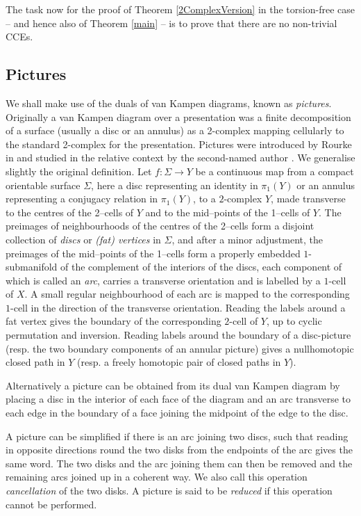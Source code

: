 \documentclass[12pt,a4paper]{amsart}
\begin{document}
\smallskip
The task now  for the proof of Theorem \ref{2ComplexVersion} in the torsion-free case 
-- and hence also of Theorem \ref{main} -- is to prove that there are no
non-trivial CCEs.  



\subsection{Pictures} 

We shall  make use of the duals of van Kampen diagrams, 
known as {\em pictures}.   
Originally a van Kampen diagram over a presentation was 
a finite decomposition of a surface (usually a disc or an annulus)
as a 2-complex mapping cellularly to the standard 2-complex for the presentation.
Pictures were introduced by Rourke in \cite{Rou} and studied in  the relative context by the second-named author \cite{S81}. 
We generalise slightly the original definition.
Let  $f:\Sigma\to Y$ be a continuous map from  a compact orientable surface  $\Sigma$,  
	here a disc representing an identity in $\pi_1(Y)$ 
	or an annulus representing a conjugacy relation in $\pi_1(Y)$, to  a $2$-complex $Y$, made transverse to the centres of the 2--cells of $Y$ and
	to the mid--points of the 1--cells of $Y$.
	The preimages of neighbourhoods of the centres of the 2--cells form a disjoint collection of 
	{\em discs} or {\em (fat) vertices} in $\Sigma$, and after a minor adjustment, 
	the preimages of the mid--points of the 1--cells form a properly embedded $1$-submanifold of the complement of the interiors of the discs, 
	each component of which is called an {\em arc}, carries a transverse orientation and is labelled by a $1$-cell of $X$.
A small regular neighbourhood of each arc is mapped to the corresponding $1$-cell in the direction of the transverse orientation.  
Reading the labels around a fat vertex gives the boundary of the corresponding $2$-cell of $Y$, up to cyclic permutation and inversion.    Reading labels around the boundary of a disc-picture (resp. the two boundary components of an annular picture) gives a nullhomotopic closed path in $Y$ (resp. a freely homotopic pair of closed paths in $Y$). 

Alternatively a picture can be obtained from 
 its dual van Kampen diagram by placing a disc in the interior of each face of the diagram and an arc transverse to each edge in the boundary of a face joining the midpoint of the edge to the disc.

A picture can be simplified 
if there is an arc joining two discs, 
such that reading in opposite directions round the two disks from the endpoints of the arc gives the same word.
The two disks and the arc joining them can then be removed and the remaining arcs joined up in a coherent way.
We also call this operation {\em cancellation} of the two disks.
A picture is said to be {\em reduced} if this operation cannot be performed.
\end{document}
